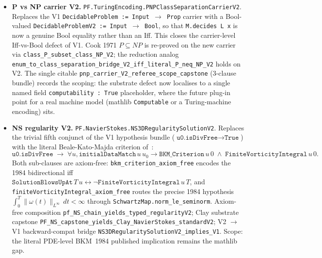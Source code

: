 \begin{itemize}
\item \textbf{P vs NP carrier V2.}
\texttt{PF.\allowbreak{}Turing\allowbreak{}Encoding.\allowbreak{}PNPClass\allowbreak{}Separation\allowbreak{}Carrier\allowbreak{}V2}. Replaces the
V1 \texttt{Decidable\allowbreak{}Problem~:=~Input~$\to$~Prop} carrier with a
Bool-valued \texttt{Decidable\allowbreak{}Problem\allowbreak{}V2~:=~Input~$\to$~Bool}, so that
\texttt{M.decides~L~x} is now a genuine Bool equality rather than an
Iff. This closes the carrier-level Iff-vs-Bool defect of V1.
Cook 1971 $P \subseteq NP$ is re-proved on the new carrier via
\texttt{class\_\allowbreak{}P\_\allowbreak{}subset\_\allowbreak{}class\_\allowbreak{}NP\_\allowbreak{}V2}; the reduction analog
\texttt{enum\_\allowbreak{}to\_\allowbreak{}class\_\allowbreak{}separation\_\allowbreak{}bridge\_\allowbreak{}V2\_\allowbreak{}iff\_\allowbreak{}literal\_\allowbreak{}P\_\allowbreak{}neq\_\allowbreak{}NP\_\allowbreak{}V2}
holds on V2. The single citable
\texttt{pnp\_\allowbreak{}carrier\_\allowbreak{}V2\_\allowbreak{}referee\_\allowbreak{}scope\_\allowbreak{}capstone} (3-clause bundle)
records the scoping: the substrate defect now localises to a
single named field \texttt{computability~:~True} placeholder, where
the future plug-in point for a real machine model (mathlib
\texttt{Computable} or a Turing-machine encoding) sits.

\item \textbf{NS regularity V2.}
\texttt{PF.\allowbreak{}NavierStokes.\allowbreak{}NS3DRegularity\allowbreak{}Solution\allowbreak{}V2}. Replaces the
trivial fifth conjunct of the V1 hypothesis bundle
($\texttt{u0.isDivFree} \to \texttt{True}$) with the literal
Beale-Kato-Majda criterion of~\cite{beale1984}:
\[
\texttt{u0.isDivFree}\;\to\;
\forall u, \texttt{initialDataMatch}\,u\,u_0 \to
\texttt{BKM\_Criterion}\,u\,0 \;\wedge\;
\texttt{FiniteVorticityIntegral}\,u\,0.
\]
Both sub-clauses are axiom-free:
\texttt{bkm\_criterion\_axiom\_free} encodes the 1984 bidirectional
iff $\texttt{SolutionBlowsUpAt}\,T\,u \leftrightarrow
\neg \texttt{FiniteVorticityIntegral}\,u\,T$, and
\texttt{finite\allowbreak{}Vorticity\allowbreak{}Integral\_\allowbreak{}axiom\_\allowbreak{}free} routes the precise
1984 hypothesis $\int_0^T \|\omega(t)\|_{L^\infty} \,dt < \infty$
through \texttt{SchwartzMap.\allowbreak{}norm\_\allowbreak{}le\_\allowbreak{}seminorm}. Axiom-free composition
\texttt{pf\_\allowbreak{}NS\_\allowbreak{}chain\_\allowbreak{}yields\_\allowbreak{}typed\_\allowbreak{}regularityV2}; Clay substrate
capstone
\texttt{PF\_\allowbreak{}NS\_\allowbreak{}capstone\_\allowbreak{}yields\_\allowbreak{}Clay\_\allowbreak{}NavierStokes\_\allowbreak{}standardV2};
V2 $\to$ V1 backward-compat bridge
\texttt{NS3DRegularity\allowbreak{}Solution\allowbreak{}V2\_\allowbreak{}implies\_\allowbreak{}V1}. Scope: the
literal PDE-level BKM~1984 published implication remains the mathlib
gap.


\end{itemize}
